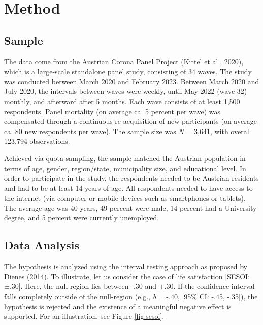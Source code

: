 \documentclass[
  man,mask,floatsintext]{apa7}
\begin{document}
\section{Method}\label{method}

\subsection{Sample}\label{sample}

The data come from the Austrian Corona Panel Project (Kittel et al., 2020), which is a large-scale standalone panel study, consisting of 34 waves.
The study was conducted between March 2020 and February 2023.
Between March 2020 and July 2020, the intervals between waves were weekly, until May 2022 (wave 32) monthly, and afterward after 5 months.
Each wave consists of at least 1,500 respondents.
Panel mortality (on average ca. 5 percent per wave) was compensated through a continuous re-acquisition of new participants (on average ca. 80 new respondents per wave).
The sample size was \emph{N} = 3,641, with overall 123,794 observations.

Achieved via quota sampling, the sample matched the Austrian population in terms of age, gender, region/state, municipality size, and educational level.
In order to participate in the study, the respondents needed to be Austrian residents and had to be at least 14 years of age.
All respondents needed to have access to the internet (via computer or mobile devices such as smartphones or tablets).
The average age was 40 years, 49 percent were male, 14 percent had a University degree, and 5 percent were currently unemployed.

\subsection{Data Analysis}\label{data-analysis}

The hypothesis is analyzed using the interval testing approach as proposed by Dienes (2014).
To illustrate, let us consider the case of life satisfaction {[}SESOI: ±.30{]}.
Here, the null-region lies between -.30 and +.30.
If the confidence interval falls completely outside of the null-region (e.g., \emph{b} = -.40, {[}95\% CI: -.45, -.35{]}), the hypothesis is rejected and the existence of a meaningful negative effect is supported.
For an illustration, see Figure \ref{fig:sesoi}.
\end{document}
